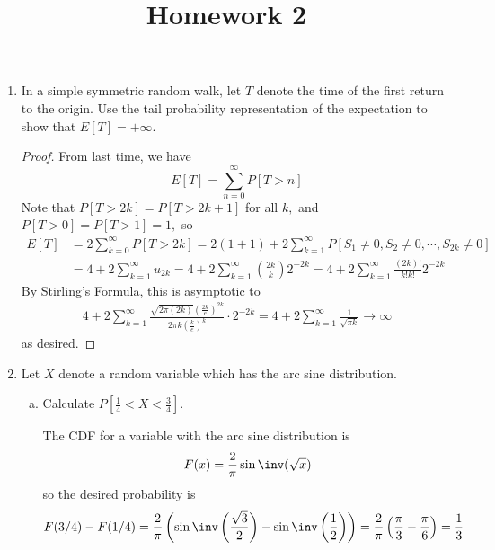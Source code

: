 \documentclass{article}
\begin{document}
\title{Homework 2}
\maketitle
\thispagestyle{fancy}

\begin{enumerate}[(1)] 
	\item In a simple symmetric random walk, let $T$ denote the time of the first return to the origin. Use the tail probability representation of the expectation to show that $E[T]=+\infty.$
		\begin{proof}
			From last time, we have
			\[E[T] = \sum_{n=0}^{\infty}P[T>n]\]
			Note that $P[T>2k] = P[T> 2k+1]$ for all $k,$ and $P[T>0]=P[T>1]=1,$ so
			\begin{align*}
				E[T]&=2\sum_{k=0}^{\infty}P[T> 2k]=2(1+1)+2\sum_{k=1}^{\infty}P[S_1\neq 0, S_2\neq 0, \cdots, S_{2k}\neq0] \\
				&= 4+2\sum_{k=1}^{\infty}u_{2k} = 4+2\sum_{k=1}^{\infty} \binom{2k}{k}2^{-2k} = 4+2\sum_{k=1}^{\infty}\frac{(2k)!}{k!k!}2^{-2k}
			\end{align*}
			By Stirling's Formula, this is asymptotic to
			\begin{align*}
				4+2\sum_{k=1}^{\infty} \frac{\sqrt{2\pi (2k)}\left( \frac{2k}{e} \right)^{2k}}{2\pi k\left( \frac{k}{e} \right)^k}\cdot2^{-2k} = 4+2\sum_{k=1}^{\infty}\frac{1}{\sqrt{\pi k}}\to \infty
			\end{align*}
			as desired.
		\end{proof}

	\item Let $X$ denote a random variable which has the arc sine distribution.

		\begin{enumerate}[(a)]
			\item Calculate $P\left[ \frac{1}{4}<X<\frac{3}{4} \right].$ 
				\begin{soln}
					The CDF for a variable with the arc sine distribution is
					\[F(x)=\frac{2}{\pi}\sin\inv(\sqrt{x})\]
					so the desired probability is
					\[F(3/4)-F(1/4) = \frac{2}{\pi}\left( \sin\inv\left( \frac{\sqrt{3}}{2} \right) - \sin\inv\left( \frac{1}{2} \right) \right) = \frac{2}{\pi} \left( \frac{\pi}{3} - \frac{\pi}{6} \right) = \frac{1}{3}\]
				\end{soln}


\end{enumerate}
\end{enumerate}
\end{document}
